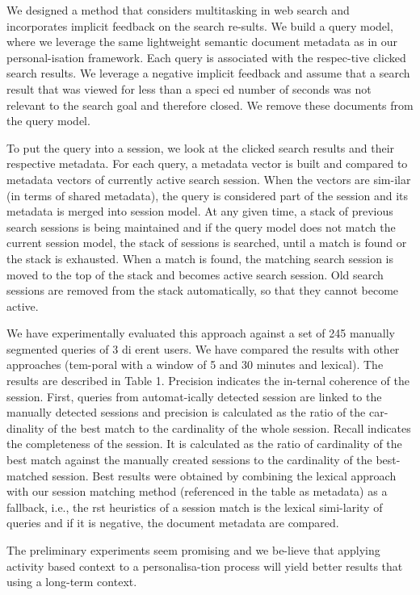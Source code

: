 \documentclass{acm_proc_article-sp} %
\begin{document}
{We designed a method that considers multitasking in web search and incorporates implicit feedback on the search re-sults. We build a query model, where we leverage the same lightweight semantic document metadata as in our personal-isation framework. Each query is associated with the respec-tive clicked search results. We leverage a negative implicit feedback and assume that a search result that was viewed for less than a speci ed number of seconds was not relevant to the search goal and therefore closed. We remove these documents from the query model.

To put the query into a session, we look at the clicked search results and their respective metadata. For each query, a metadata vector is built and compared to metadata vectors of currently active search session. When the vectors are sim-ilar (in terms of shared metadata), the query is considered part of the session and its metadata is merged into session model. At any given time, a stack of previous search sessions is being maintained and if the query model does not match the current session model, the stack of sessions is searched, until a match is found or the stack is exhausted. When a match is found, the matching search session is moved to the top of the stack and becomes active search session. Old search sessions are removed from the stack automatically, so that they cannot become active.

We have experimentally evaluated this approach against a set of 245 manually segmented queries of 3 di erent users. We have compared the results with other approaches (tem-poral with a window of 5 and 30 minutes and lexical). The results are described in Table 1. Precision indicates the in-ternal coherence of the session. First, queries from automat-ically detected session are linked to the manually detected sessions and precision is calculated as the ratio of the car-dinality of the best match to the cardinality of the whole session. Recall indicates the completeness of the session. It is calculated as the ratio of cardinality of the best match against the manually created sessions to the cardinality of the best-matched session. Best results were obtained by combining the lexical approach with our session matching method (referenced in the table as metadata) as a fallback, i.e., the rst heuristics of a session match is the lexical simi-larity of queries and if it is negative, the document metadata are compared.

The preliminary experiments seem promising and we be-lieve that applying activity based context to a personalisa-tion process will yield better results that using a long-term context.

}
\end{document}

